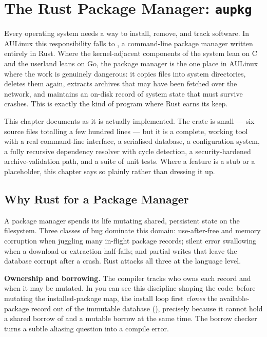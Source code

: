 \chapter{The Rust Package Manager: \texttt{aupkg}}
\label{chap:pkgmgr}

Every operating system needs a way to install, remove, and track software. In AULinux this responsibility falls to , a command-line package manager written entirely in Rust. Where the kernel-adjacent components of the system lean on C and the userland leans on Go, the package manager is the one place in AULinux where the work is genuinely dangerous: it copies files into system directories, deletes them again, extracts archives that may have been fetched over the network, and maintains an on-disk record of system state that must survive crashes. This is exactly the kind of program where Rust earns its keep.

This chapter documents  as it is actually implemented. The crate is small --- six source files totalling a few hundred lines --- but it is a complete, working tool with a real command-line interface, a serialised database, a configuration system, a fully recursive dependency resolver with cycle detection, a security-hardened archive-validation path, and a suite of unit tests. Where a feature is a stub or a placeholder, this chapter says so plainly rather than dressing it up.

\section{Why Rust for a Package Manager}

A package manager spends its life mutating shared, persistent state on the filesystem. Three classes of bug dominate this domain: use-after-free and memory corruption when juggling many in-flight package records; silent error swallowing when a download or extraction half-fails; and partial writes that leave the database corrupt after a crash. Rust attacks all three at the language level.

\textbf{Ownership and borrowing.} The compiler tracks who owns each  record and when it may be mutated. In  you can see this discipline shaping the code: before mutating the installed-package map, the install loop first \emph{clones} the available-package record out of the immutable database (), precisely because it cannot hold a shared borrow of  and a mutable borrow at the same time. The borrow checker turns a subtle aliasing question into a compile error.

